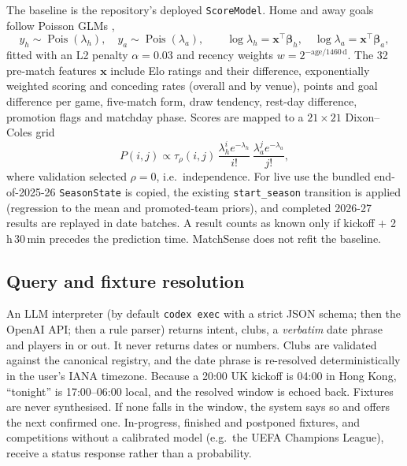 \documentclass[11pt,a4paper]{article}
\newcommand{\code}[1]{\texttt{\small #1}}
\begin{document}
The baseline is the repository's deployed \code{ScoreModel}. Home and away
goals follow Poisson GLMs \citep{mccullagh1989},
\begin{equation}
  y_h \sim \operatorname{Pois}(\lambda_h),\quad y_a \sim \operatorname{Pois}(\lambda_a),\qquad
  \log\lambda_h = \mathbf x^\top\bm\beta_h,\quad \log\lambda_a = \mathbf x^\top\bm\beta_a,
\end{equation}
fitted with an L2 penalty $\alpha=0.03$ and recency weights
$w=2^{-\text{age}/1460\,\text{d}}$. The 32 pre-match features $\mathbf x$
include Elo ratings and their difference, exponentially weighted scoring and
conceding rates (overall and by venue), points and goal difference per game,
five-match form, draw tendency, rest-day difference, promotion flags and
matchday phase. Scores are mapped to a $21\times21$ Dixon--Coles grid
\begin{equation}
  P(i,j) \propto \tau_\rho(i,j)\,\frac{\lambda_h^i e^{-\lambda_h}}{i!}\,\frac{\lambda_a^j e^{-\lambda_a}}{j!},
\end{equation}
where validation selected $\rho=0$, i.e.\ independence. For live use the
bundled end-of-2025-26 \code{SeasonState} is copied, the existing
\code{start\_season} transition is applied (regression to the mean and
promoted-team priors), and completed 2026-27 results are replayed in date
batches. A result counts as known only if kickoff $+$ 2\,h\,30\,min precedes
the prediction time. MatchSense does not refit the baseline.

\subsection{Query and fixture resolution}

An LLM interpreter (by default \code{codex exec} with a strict JSON schema;
then the OpenAI API; then a rule parser) returns intent, clubs, a
\emph{verbatim} date phrase and players in or out. It never returns dates or
numbers. Clubs are validated against the canonical registry, and the date
phrase is re-resolved deterministically in the user's IANA timezone. Because a
20:00 UK kickoff is 04:00 in Hong Kong, ``tonight'' is 17:00--06:00 local, and
the resolved window is echoed back. Fixtures are never synthesised. If none
falls in the window, the system says so and offers the next confirmed one.
In-progress, finished and postponed fixtures, and competitions without a
calibrated model (e.g.\ the UEFA Champions League), receive a status response
rather than a probability.
\end{document}
